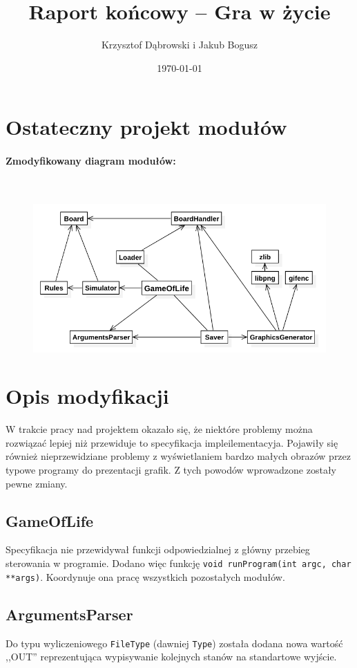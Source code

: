 \documentclass{mwart}
\title{Raport końcowy -- Gra w życie}
\author{Krzysztof Dąbrowski i Jakub Bogusz}
\date{\today}
\begin{document}
\maketitle{}

\tableofcontents{}

\section{Ostateczny projekt modułów}
\paragraph{Zmodyfikowany diagram modułów:}\mbox{}\\
\begin{figure}[H]
	\centering
	\def\svgwidth{\columnwidth}
	\includegraphics[width=13cm]{diagram_modulow.png}
\end{figure}

\section{Opis modyfikacji}
W trakcie pracy nad projektem okazało się, że niektóre problemy można rozwiązać lepiej niż przewiduje to specyfikacja impleilementacyja. Pojawiły się również nieprzewidziane problemy z wyświetlaniem bardzo małych obrazów przez typowe programy do prezentacji grafik. Z tych powodów wprowadzone zostały pewne zmiany.

\subsection{GameOfLife}
Specyfikacja nie przewidywał funkcji odpowiedzialnej z główny przebieg sterowania w programie. Dodano więc funkcję \texttt{void runProgram(int argc, char **args)}.
Koordynuje ona pracę wszystkich pozostałych modułów.

\subsection{ArgumentsParser}
Do typu wyliczeniowego \texttt{FileType} (dawniej \texttt{Type}) została dodana nowa wartość ,,OUT'' reprezentująca wypisywanie kolejnych stanów na standartowe wyjście.
\end{document}
